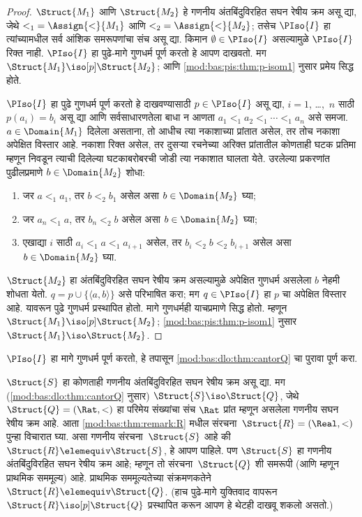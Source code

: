 \begin{proof}
  $\Struct{M_1}$ आणि $\Struct{M_2}$ हे गणनीय अंतबिंदुविरहित
  सघन रेषीय क्रम असू द्या, जेथे ${<_1} = \Assign{<}{M_1}$ आणि ${<_2} =
  \Assign{<}{M_2}$; तसेच $\PIso{I}$ हा त्यांच्यामधील सर्व आंशिक
  समरूपणांचा संच असू द्या. किमान $\emptyset \in \PIso{I}$ असल्यामुळे
  $\PIso{I}$ रिक्त नाही. $\PIso{I}$ हा पुढे-मागे गुणधर्म पूर्ण करतो हे
  आपण दाखवतो. मग $\Struct{M_1} \iso[p] \Struct{M_2}$; आणि
  \ref{mod:bas:pis:thm:p-isom1} नुसार प्रमेय सिद्ध होते.

  $\PIso{I}$ हा पुढे गुणधर्म पूर्ण करतो हे दाखवण्यासाठी $p \in
  \PIso{I}$ असू द्या, $i = 1$, \dots,~$n$ साठी $p(a_i) = b_i$ असू द्या
  आणि सर्वसाधारणतेला बाधा न आणता $a_1 <_1 a_2 <_1 \cdots <_1 a_n$
  असे समजा. $a \in \Domain{M_1}$ दिलेला असताना, तो आधीच त्या नकाशाच्या
  प्रांतात असेल, तर तोच नकाशा अपेक्षित विस्तार आहे. नकाशा रिक्त असेल,
  तर दुसऱ्या रचनेच्या अरिक्त प्रांतातील कोणताही घटक प्रतिमा म्हणून
  निवडून त्याची दिलेल्या घटकाबरोबरची जोडी त्या नकाशात घालता येते.
  उरलेल्या प्रकरणांत
  पुढीलप्रमाणे $b \in \Domain{M_2}$ शोधा:

  \begin{enumerate}
  \item जर $a <_1 a_1$, तर $b <_2 b_1$ असेल असा $b \in
    \Domain{M_2}$ घ्या;
  \item जर $a_n <_1 a$, तर $b_n <_2 b$ असेल असा $b \in \Domain{M_2}$ घ्या;
 \item एखाद्या $i$ साठी $a_i <_1 a <_1 a_{i+1}$ असेल, तर $b_i <_2 b
   <_2 b_{i+1}$ असेल असा $b \in \Domain{M_2}$ घ्या.
  \end{enumerate}
  $\Struct{M_2}$ हा अंतबिंदुविरहित सघन रेषीय क्रम असल्यामुळे अपेक्षित
  गुणधर्म असलेला $b$ नेहमी शोधता येतो. $q = p \cup \{ \langle a, b
  \rangle \}$ असे परिभाषित करा; मग $q \in \PIso{I}$ हा $p$ चा अपेक्षित
  विस्तार आहे. यावरून पुढे गुणधर्म प्रस्थापित होतो. मागे गुणधर्मही
  याचप्रमाणे सिद्ध होतो. म्हणून $\Struct{M_1} \iso[p]
  \Struct{M_2}$; \ref{mod:bas:pis:thm:p-isom1} नुसार $\Struct{M_1} \iso
  \Struct{M_2}$.
\end{proof}

\begin{prob}
  $\PIso{I}$ हा मागे गुणधर्म पूर्ण करतो, हे तपासून
  \ref{mod:bas:dlo:thm:cantorQ} चा पुरावा पूर्ण करा.
\end{prob}

\begin{rem}
  $\Struct{S}$ हा कोणताही गणनीय अंतबिंदुविरहित सघन रेषीय क्रम
  असू द्या. मग (\ref{mod:bas:dlo:thm:cantorQ} नुसार) $\Struct{S} \iso
  \Struct{Q}$, जेथे $\Struct{Q} = (\Rat, <)$ हा परिमेय संख्यांचा संच
  $\Rat$ प्रांत म्हणून असलेला गणनीय सघन रेषीय क्रम आहे. आता
  \ref{mod:bas:thm:remark:R} मधील संरचना~$\Struct{R} = (\Real, <)$
  पुन्हा विचारात घ्या. असा गणनीय संरचना~$\Struct{S}$
  आहे की $\Struct{R} \elemequiv \Struct{S}$, हे आपण पाहिले. पण
  $\Struct{S}$ हा गणनीय अंतबिंदुविरहित सघन रेषीय क्रम आहे;
  म्हणून तो संरचना~$\Struct{Q}$ शी समरूपी (आणि म्हणून प्राथमिक
  सममूल्य) आहे. प्राथमिक सममूल्यतेच्या संक्रमणकतेने $\Struct{R}
  \elemequiv \Struct{Q}$. (हाच पुढे-मागे युक्तिवाद वापरून
  $\Struct{R} \iso[p] \Struct{Q}$ प्रस्थापित करून आपण हे थेटही दाखवू
  शकलो असतो.)
\end{rem}


